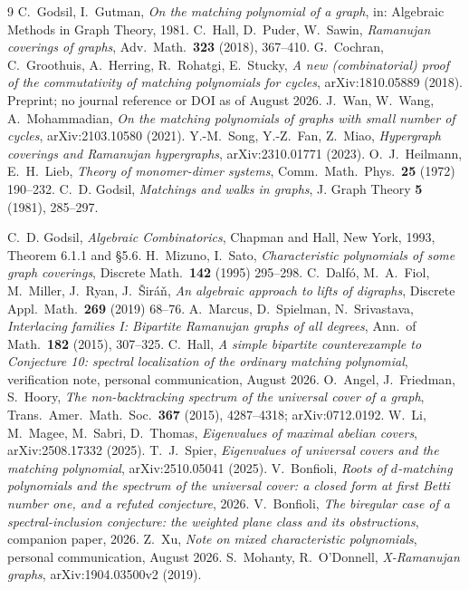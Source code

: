 \documentclass[11pt]{article}
\theoremstyle{remark}
\begin{document}
\begin{thebibliography}{9}
 C.~Godsil, I.~Gutman, \emph{On the matching polynomial of a
graph}, in: Algebraic Methods in Graph Theory, 1981.
 C.~Hall, D.~Puder, W.~Sawin, \emph{Ramanujan coverings of
graphs}, Adv.\ Math.\ \textbf{323} (2018), 367--410.
 G.~Cochran, C.~Groothuis, A.~Herring, R.~Rohatgi,
E.~Stucky, \emph{A new (combinatorial) proof of the commutativity of
matching polynomials for cycles}, arXiv:1810.05889 (2018). Preprint; no journal
reference or DOI as of August 2026.
 J.~Wan, W.~Wang, A.~Mohammadian, \emph{On the matching
polynomials of graphs with small number of cycles}, arXiv:2103.10580 (2021).
 Y.-M.~Song, Y.-Z.~Fan, Z.~Miao, \emph{Hypergraph coverings and
Ramanujan hypergraphs}, arXiv:2310.01771 (2023).
 O.~J.~Heilmann, E.~H.~Lieb, \emph{Theory of monomer-dimer
systems}, Comm.\ Math.\ Phys.\ \textbf{25} (1972) 190--232.
 C.~D. Godsil, \emph{Matchings and walks in graphs},
J. Graph Theory \textbf{5} (1981), 285--297.

 C.~D. Godsil, \emph{Algebraic Combinatorics}, Chapman and Hall,
New York, 1993, Theorem 6.1.1 and \S5.6.
 H.~Mizuno, I.~Sato, \emph{Characteristic polynomials of some graph
coverings}, Discrete Math.\ \textbf{142} (1995) 295--298.
 C.~Dalf\'o, M.~A.~Fiol, M.~Miller, J.~Ryan, J.~\v{S}ir\'a\v{n},
\emph{An algebraic approach to lifts of digraphs}, Discrete Appl.\ Math.\
\textbf{269} (2019) 68--76.
 A.~Marcus, D.~Spielman, N.~Srivastava, \emph{Interlacing
families I: Bipartite Ramanujan graphs of all degrees}, Ann.\ of Math.\
\textbf{182} (2015), 307--325.
\bibitem{HallCE} C.~Hall, \emph{A simple bipartite counterexample to Conjecture 10:
  spectral localization of the ordinary matching polynomial}, verification note, personal
  communication, August 2026.
\bibitem{AFH} O.~Angel, J.~Friedman, S.~Hoory, \emph{The non-backtracking spectrum of the
  universal cover of a graph}, Trans.\ Amer.\ Math.\ Soc.\ \textbf{367} (2015), 4287--4318;
  arXiv:0712.0192.
\bibitem{LMST} W.~Li, M.~Magee, M.~Sabri, D.~Thomas, \emph{Eigenvalues of maximal
  abelian covers}, arXiv:2508.17332 (2025).
\bibitem{Sp} T.~J.~Spier, \emph{Eigenvalues of universal covers and the matching
  polynomial}, arXiv:2510.05041 (2025).
\bibitem{PartI} V.~Bonfioli, \emph{Roots of $d$-matching polynomials and the spectrum of
  the universal cover: a closed form at first Betti number one, and a refuted conjecture}, 2026.
\bibitem{PartII} V.~Bonfioli, \emph{The biregular case of a spectral-inclusion
  conjecture: the weighted plane class and its obstructions}, companion paper, 2026.
\bibitem{Xu} Z.~Xu, \emph{Note on mixed characteristic polynomials}, personal communication,
  August 2026.
\bibitem{MO} S.~Mohanty, R.~O'Donnell, \emph{X-Ramanujan graphs}, arXiv:1904.03500v2 (2019).
\end{thebibliography}
\end{document}

